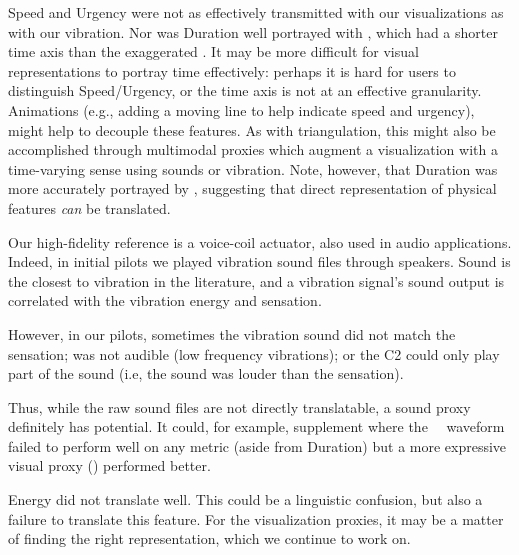     Speed and Urgency were not as effectively transmitted with our visualizations as with our vibration.
    Nor was Duration well portrayed with  \original, which had a shorter time axis than the exaggerated \linear.
    It may be more difficult for visual representations to portray time effectively: perhaps it is hard for users to distinguish Speed/Urgency, or the time axis is not at an effective granularity.
    Animations (e.g., adding a moving line to help indicate speed and urgency), might help to decouple these features.
    As with triangulation, this might also be accomplished through multimodal proxies which augment a visualization with a time-varying sense using sounds or vibration.
    Note, however, that Duration was more accurately portrayed by \linear, suggesting that direct representation of physical features \textit{can} be translated.
    
Our high-fidelity reference is a voice-coil actuator, also used in audio applications.
Indeed, in initial pilots we played vibration sound files through speakers. Sound is the closest to vibration in the literature, and a vibration signal's sound output is correlated with the vibration energy and sensation. 

However, in our pilots, sometimes the vibration sound did not match the sensation; was not audible (low frequency vibrations); or the C2 could only play part of the sound (i.e, the sound was louder than the sensation).

Thus, while the raw sound files are not directly translatable, a sound proxy definitely has potential. It could, for example, supplement where the \original~\ waveform failed to perform well on any metric (aside from Duration) but a more expressive visual proxy (\linear) performed better.


     Energy did not translate well.
     This could be a linguistic confusion, but also a failure to translate this feature.
     For the visualization proxies, it may be a matter of finding the right representation, which we continue to work on.
     
